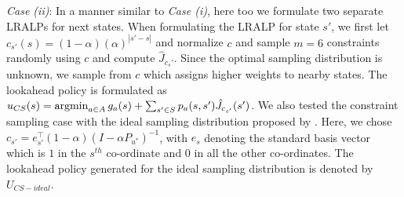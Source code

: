 \documentclass[12pt,draftcls,onecolumn]{IEEEtran}
\begin{document}
\emph{Case (ii)}: In a manner similar to \emph{Case (i)}, here too we formulate two separate LRALPs for next states. When formulating the LRALP for state $s'$, we first let $c_{s'}(s)=(1-\alpha)(\alpha)^{|s'-s|}$  and normalize $c$ and sample $m=6$ constraints randomly using $c$ and compute $\hat{J}_{c_s'}$. Since the optimal sampling distribution is unknown, we sample from $c$ which assigns higher weights to nearby states.
The lookahead policy is formulated as
$u_{CS}(s)=\operatorname{argmin}_{a\in A} g_a(s)+\sum_{s'\in S}p_a(s,s')\hat{J}_{c_{s'}}(s')$.
We also tested the constraint sampling case with the ideal sampling distribution proposed by \cite{CS}. Here, we chose $c_{s'}=e^\top_{s'}(1-\alpha)(I-\alpha P_{u^*})^{-1}$, with $e_s$ denoting the standard basis vector which is $1$ in the $s^{th}$ co-ordinate and $0$ in all the other co-ordinates. The lookahead policy generated for the ideal sampling distribution is denoted by $U_{CS-ideal}$.
\FloatBarrier
\end{document}
